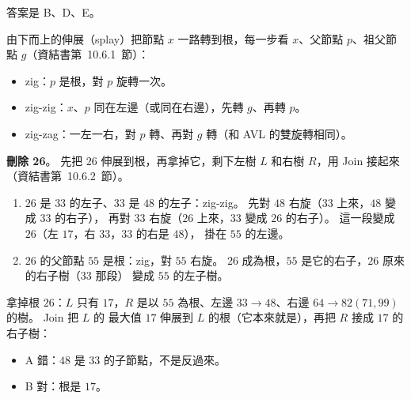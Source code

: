 \begin{pastsoln}
答案是 B、D、E。

由下而上的伸展（splay）把節點 $x$ 一路轉到根，每一步看 $x$、父節點 $p$、祖父節點 $g$（資結書第~10.6.1~節）：
\begin{itemize}
\item zig：$p$ 是根，對 $p$ 旋轉一次。
\item zig-zig：$x$、$p$ 同在左邊（或同在右邊），先轉 $g$、再轉 $p$。
\item zig-zag：一左一右，對 $p$ 轉、再對 $g$ 轉（和 AVL 的雙旋轉相同）。
\end{itemize}

\textbf{刪除 26}。 先把 $26$ 伸展到根，再拿掉它，剩下左樹 $L$ 和右樹 $R$，用 Join 接起來（資結書第~10.6.2~節）。
\begin{enumerate}
\item $26$ 是 $33$ 的左子、$33$ 是 $48$ 的左子：zig-zig。 先對 $48$ 右旋（$33$ 上來，$48$ 變成 $33$ 的右子），
再對 $33$ 右旋（$26$ 上來，$33$ 變成 $26$ 的右子）。 這一段變成 $26$（左 $17$，右 $33$，$33$ 的右是 $48$），
掛在 $55$ 的左邊。
\item $26$ 的父節點 $55$ 是根：zig，對 $55$ 右旋。 $26$ 成為根，$55$ 是它的右子，$26$ 原來的右子樹（$33$ 那段）
變成 $55$ 的左子樹。
\end{enumerate}
拿掉根 $26$：$L$ 只有 $17$，$R$ 是以 $55$ 為根、左邊 $33 \to 48$、右邊 $64 \to 82(71, 99)$ 的樹。 Join 把 $L$ 的
最大值 $17$ 伸展到 $L$ 的根（它本來就是），再把 $R$ 接成 $17$ 的右子樹：
\begin{center}
\end{center}
\begin{itemize}
\item A 錯：$48$ 是 $33$ 的子節點，不是反過來。
\item B 對：根是 $17$。
\end{itemize}


\end{pastsoln}
